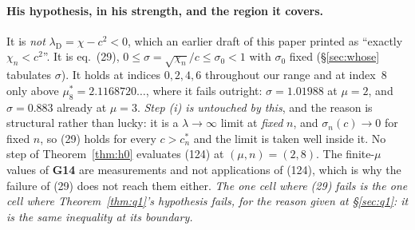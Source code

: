 \documentclass[11pt,a4paper]{article}
\theoremstyle{plain}
\theoremstyle{definition}
\theoremstyle{remark}
\begin{document}
\paragraph{His hypothesis, in his strength, and the region it covers.}  It is
\emph{not} $\lambda_{\mathrm D}=\chi-c^2<0$, which an earlier draft of this
paper printed as ``exactly $\chi_n<c^2$''.  It is eq.~(29),
$0\le\sigma=\sqrt{\chi_n}/c\le\sigma_0<1$ with $\sigma_0$ fixed
(\S\ref{sec:whose} tabulates $\sigma$).  It holds at indices $0,2,4,6$
throughout our range and at index~$8$ only above $\mu^*_8=2.1168720\ldots$,
where it fails outright: $\sigma=1.01988$ at $\mu=2$, and $\sigma=0.883$
already at $\mu=3$.  \emph{Step (i) is untouched by this}, and the reason is
structural rather than lucky: it is a $\lambda\to\infty$ limit at \emph{fixed}
$n$, and $\sigma_n(c)\to0$ for fixed $n$, so (29) holds for every $c>c^*_n$ and
the limit is taken well inside it.  No step of Theorem~\ref{thm:h0} evaluates
(124) at $(\mu,n)=(2,8)$.  The finite-$\mu$ values of \textbf{G14} are
measurements and not applications of (124), which is why the failure of (29)
does not reach them either.  \emph{The one cell where (29) fails is the one
cell where Theorem~\ref{thm:q1}'s hypothesis fails, for the reason given at
\S\ref{sec:q1}: it is the same inequality at its boundary.}
\end{document}
